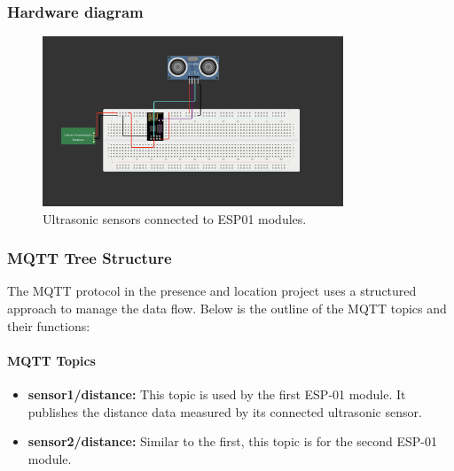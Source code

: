 \subsubsection{Hardware diagram}
\begin{figure}[ht]
    \centering
    \includegraphics[width=0.8\textwidth]{../images/presence-sensor.png}
    \caption{Ultrasonic sensors connected to ESP01 modules.}
    \label{fig:esp32_system_monitor}
\end{figure}

\subsubsection{MQTT Tree Structure}
The MQTT protocol in the presence and location project uses a structured approach to manage the data flow. Below is the outline of the MQTT topics and their functions:

\paragraph{MQTT Topics}
\begin{itemize}
    \item \textbf{sensor1/distance:} This topic is used by the first ESP-01 module. It publishes the distance data measured by its connected ultrasonic sensor.
    \item \textbf{sensor2/distance:} Similar to the first, this topic is for the second ESP-01 module.
\end{itemize}
